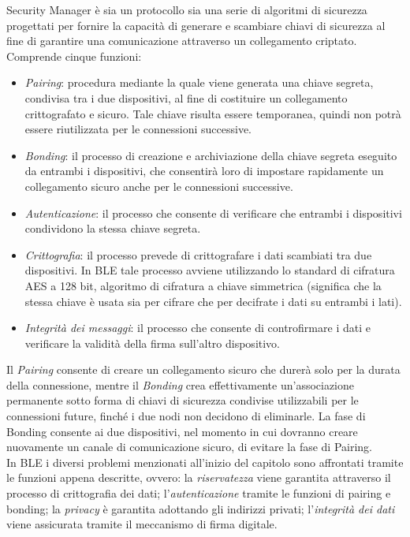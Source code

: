 \noindent Security Manager è sia un protocollo sia una serie di algoritmi di sicurezza progettati per fornire la capacità di generare e scambiare chiavi di sicurezza al fine di garantire una comunicazione attraverso un collegamento criptato. Comprende cinque funzioni:
\begin{itemize}
    \item \textit{Pairing}: procedura mediante la quale viene generata una chiave segreta, condivisa tra i due dispositivi, al fine di costituire un collegamento crittografato e sicuro. Tale chiave risulta essere temporanea, quindi non potrà essere riutilizzata per le connessioni successive.
    
    \item \textit{Bonding}: il processo di creazione e archiviazione della chiave segreta eseguito da entrambi i dispositivi, che consentirà loro di impostare rapidamente un collegamento sicuro anche per le connessioni successive.
    
    \item \textit{Autenticazione}: il processo che consente di verificare che entrambi i dispositivi condividono la stessa chiave segreta.
    
    \item \textit{Crittografia}: il processo prevede di crittografare i dati scambiati tra due dispositivi. In BLE tale processo avviene utilizzando lo standard di cifratura AES a 128 bit, algoritmo di cifratura a chiave simmetrica (significa che la stessa chiave è usata sia per cifrare che per decifrate i dati su entrambi i lati).
    
    \item \textit{Integrità dei messaggi}: il processo che consente di controfirmare i dati e verificare la validità della firma sull'altro dispositivo.
\end{itemize}
Il \textit{Pairing} consente di creare un collegamento sicuro che durerà solo per la durata della connessione, mentre il \textit{Bonding} crea effettivamente un'associazione permanente sotto forma di chiavi di sicurezza condivise utilizzabili per le connessioni future, finché i due nodi non decidono di eliminarle. La fase di Bonding consente ai due dispositivi, nel momento in cui dovranno creare nuovamente un canale di comunicazione sicuro, di evitare la fase di Pairing.\\

\noindent In BLE i diversi problemi menzionati all'inizio del capitolo sono affrontati tramite le funzioni appena descritte, ovvero: la \textit{riservatezza} viene garantita attraverso il processo di crittografia dei dati; l'\textit{autenticazione} tramite le funzioni di pairing e bonding; la \textit{privacy} è garantita adottando gli indirizzi privati; l'\textit{integrità dei dati} viene assicurata tramite il meccanismo di firma digitale.

